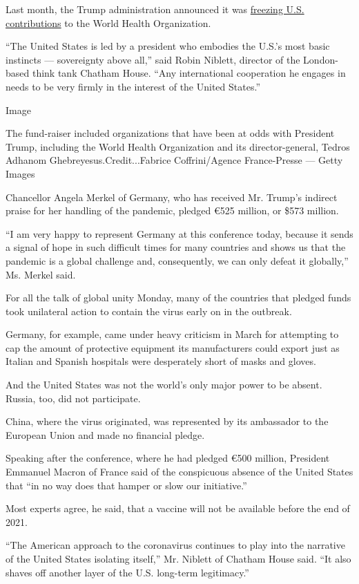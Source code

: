 Last month, the Trump administration announced it was
\href{https://www.nytimes3xbfgragh.onion/2020/04/15/us/politics/trump-coronavirus-who.html}{freezing
U.S. contributions} to the World Health Organization.

``The United States is led by a president who embodies the U.S.'s most
basic instincts --- sovereignty above all,'' said Robin Niblett,
director of the London-based think tank Chatham House. ``Any
international cooperation he engages in needs to be very firmly in the
interest of the United States.''

Image

The fund-raiser included organizations that have been at odds with
President Trump, including the World Health Organization and its
director-general, Tedros Adhanom Ghebreyesus.Credit...Fabrice
Coffrini/Agence France-Presse --- Getty Images

Chancellor Angela Merkel of Germany, who has received Mr. Trump's
indirect praise for her handling of the pandemic, pledged €525 million,
or \$573 million.

``I am very happy to represent Germany at this conference today, because
it sends a signal of hope in such difficult times for many countries and
shows us that the pandemic is a global challenge and, consequently, we
can only defeat it globally,'' Ms. Merkel said.

For all the talk of global unity Monday, many of the countries that
pledged funds took unilateral action to contain the virus early on in
the outbreak.

Germany, for example, came under heavy criticism in March for attempting
to cap the amount of protective equipment its manufacturers could export
just as Italian and Spanish hospitals were desperately short of masks
and gloves.

And the United States was not the world's only major power to be absent.
Russia, too, did not participate.

China, where the virus originated, was represented by its ambassador to
the European Union and made no financial pledge.

Speaking after the conference, where he had pledged €500 million,
President Emmanuel Macron of France said of the conspicuous absence of
the United States that ``in no way does that hamper or slow our
initiative.''

Most experts agree, he said, that a vaccine will not be available before
the end of 2021.

``The American approach to the coronavirus continues to play into the
narrative of the United States isolating itself,'' Mr. Niblett of
Chatham House said. ``It also shaves off another layer of the U.S.
long-term legitimacy.''

